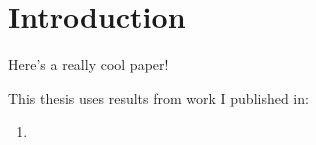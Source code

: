 \chapter{Introduction}
\label{ch:intro}


Here's a really cool paper!~\cite{strowes:2011:reallycool}

This thesis uses results from work I published in:
\begin{enumerate}
        \item {}
\end{enumerate}




